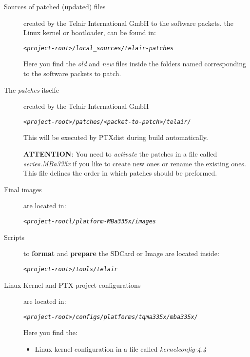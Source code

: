 \begin{description}
    \item[Sources of patched (updated) files] created by the Telair
        International GmbH to the software packets, the Linux kernel or
        bootloader, can be found in:

        \label{part:telairpatchessources}
        \begin{alltt}
        \textit{<project-root>/local\_sources/telair-patches}
        \end{alltt}

        Here you find the \textit{old} and \textit{new} files inside the folders
        named corresponding to the software packets to patch.

    \item[The \textit{patches} itselfe] created by the Telair International GmbH

        \begin{alltt}
        \textit{<project-root>/patches/<packet-to-patch>/telair/}
        \end{alltt}

        This will be executed by PTXdist during build automatically.

        \textbf{ATTENTION}: You need to \textit{activate} the patches in a file
        called \textit{series.MBa335x} if you like to create new ones or rename
        the existing ones. This file defines the order in which patches should
        be preformed.

\label{part:location_finalimage}
    \item[Final images] are located in:
        \begin{alltt}
        \textit{<project-rootl/platform-MBa335x/images}
        \end{alltt}

\label{part:location_scripts}
    \item[Scripts] to \textbf{format} and \textbf{prepare} the SDCard or Image
        are located inside:
        \begin{alltt}
        \textit{<project-root>/tools/telair}
        \end{alltt}

    \item[Linux Kernel and PTX project configurations]are located in:
        \begin{alltt}
        \textit{<project-root>/configs/platforms/tqma335x/mba335x/}
        \end{alltt}
        Here you find the:
        \begin{itemize}
            \item Linux kernel configuration in a file called
        \textit{kernelconfig-4.4}


\end{itemize}
\end{description}
